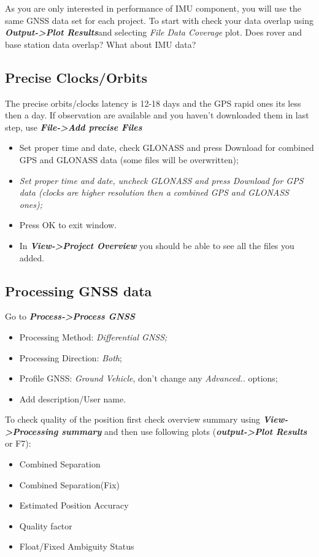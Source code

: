 \documentclass[british]{book}
\begin{document}
As you are only interested in performance of IMU component, you will use the same GNSS data set for each project. To start with check your data overlap using \textbf{\emph{Output->Plot Results}}and selecting\emph{ File Data Coverage }plot. Does rover and base station data overlap? What about IMU data?

\subsection{Precise Clocks/Orbits}
The precise orbits/clocks latency is 12-18 days and the GPS rapid ones its less then a day. If observation are available and you haven't downloaded them in last step, use \textbf{\emph{File->Add precise Files}} 
\begin{itemize}
	\item Set proper time and date, check GLONASS and press Download for combined GPS and GLONASS data (some files will be overwritten);
	\item \emph{Set proper time and date, uncheck GLONASS and press Download for GPS data (clocks are higher resolution then a combined GPS and
	GLONASS ones);}
	\item Press OK to exit window.
	\item In \textbf{\emph{View->Project Overview}} you should be able to see all the files you added.
\end{itemize}

\subsection{Processing GNSS data}

Go to\emph{ }\textbf{\emph{Process->Process GNSS}}
\begin{itemize}
	\item Processing Method: \emph{Differential GNSS;}
	\item Processing Direction: \emph{Both};
	\item Profile GNSS: \emph{Ground Vehicle}, don't change any \emph{Advanced..}
	options;
	\item Add description/User name.
\end{itemize}

To check quality of the position first check overview summary using \textbf{\emph{View->Processing summary}} and then use following plots (\textbf{\emph{output->Plot Results}} or F7): 

\begin{itemize}
	\item Combined Separation
	\item Combined Separation(Fix)
	\item Estimated Position Accuracy
	\item Quality factor
	\item Float/Fixed Ambiguity Status
\end{itemize}
\end{document}

